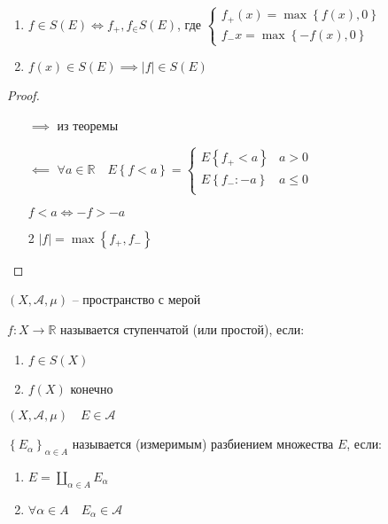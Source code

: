 \documentclass{book}
\newcommand\R{\ensuremath{\mathbb{R}}}
\theoremstyle{definition}
\begin{document}
\begin{statement}
    \begin{enumerate}
        \item 
        $f\in S(E) \iff f_+, f_\in S(E)$, где $\begin{cases}
            f_+(x) = \max\left\{f(x), 0\right\}\\
            f_-{x} = \max\left\{ -f(x), 0 \right\} 
        \end{cases}$
    \item $f(x)\in S(E) \implies |f|\in S(E)$
    \end{enumerate}
\end{statement}
\begin{proof}
    \begin{enumerate}
        \item []
        \item [$\implies $] из  теоремы
        \item [$\impliedby $] $\forall a\in \R\quad E\left\{ f<a \right\}  = \begin{cases}
                E\left\{ f_+<a \right\} &a>0\\
                E\left\{ f_-:-a \right\} &a\leqslant 0\\
        \end{cases}$

        $f<a \iff  -f > -a$
    \item [2] $|f| = \max\left\{ f_+, f_- \right\} $
    \end{enumerate}
\end{proof}

\begin{definition}
    $\left( X, \mathcal A, \mu \right) $ -- пространство с мерой

    $f: X\to \R$ называется ступенчатой (или простой), если:
    \begin{enumerate}
        \item $f\in S(X)$
        \item  $f(X)$ конечно
    \end{enumerate}
\end{definition}

\begin{definition}
    $\left( X, \mathcal A, \mu \right) \quad E\in \mathcal A$ 

    $\left\{ E_{\alpha} \right\} _{\alpha\in A}$ называется (измеримым) разбиением множества $E$, если:
    \begin{enumerate}
        \item $E = \coprod_{\alpha\in A}E_{\alpha}$
        \item  $\forall \alpha\in A\quad E_{\alpha}\in\mathcal A$
    \end{enumerate}
\end{definition}
\end{document}

